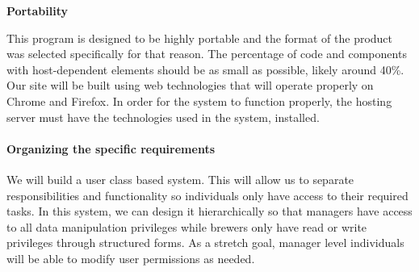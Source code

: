 		\textbf{Portability}

		This program is designed to be highly portable and the format of the product was selected specifically for that reason.
		The percentage of code and components with host-dependent elements should be as small as possible, likely around 40\%.
		Our site will be built using web technologies that will operate properly on Chrome and Firefox.
        In order for the system to function properly, the hosting server must have the technologies used in the system, installed.

	\paragraph{Organizing the specific requirements}
		We will build a user class based system.
        This will allow us to separate responsibilities and functionality so individuals only have access to their required tasks.
        In this system, we can design it hierarchically so that managers have access to all data manipulation privileges while brewers only have read or write privileges through structured forms.
        As a stretch goal, manager level individuals will be able to modify user permissions as needed.

\pagebreak

